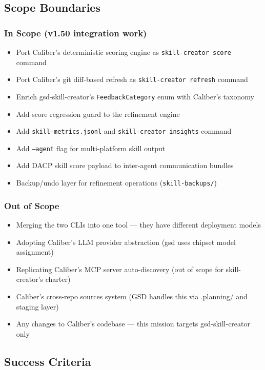 \documentclass[11pt,letterpaper]{article}
\begin{document}
\subsection{Scope Boundaries}

\subsubsection{In Scope (v1.50 integration work)}
\begin{itemize}[leftmargin=1.5em]
  \item Port Caliber's deterministic scoring engine as \texttt{skill-creator score} command
  \item Port Caliber's git diff-based refresh as \texttt{skill-creator refresh} command
  \item Enrich gsd-skill-creator's \texttt{FeedbackCategory} enum with Caliber's taxonomy
  \item Add score regression guard to the refinement engine
  \item Add \texttt{skill-metrics.jsonl} and \texttt{skill-creator insights} command
  \item Add \texttt{--agent} flag for multi-platform skill output
  \item Add DACP skill score payload to inter-agent communication bundles
  \item Backup/undo layer for refinement operations (\texttt{skill-backups/})
\end{itemize}

\subsubsection{Out of Scope}
\begin{itemize}[leftmargin=1.5em]
  \item Merging the two CLIs into one tool — they have different deployment models
  \item Adopting Caliber's LLM provider abstraction (gsd uses chipset model assignment)
  \item Replicating Caliber's MCP server auto-discovery (out of scope for skill-creator's charter)
  \item Caliber's cross-repo sources system (GSD handles this via .planning/ and staging layer)
  \item Any changes to Caliber's codebase — this mission targets gsd-skill-creator only
\end{itemize}

\subsection{Success Criteria}
\end{document}
